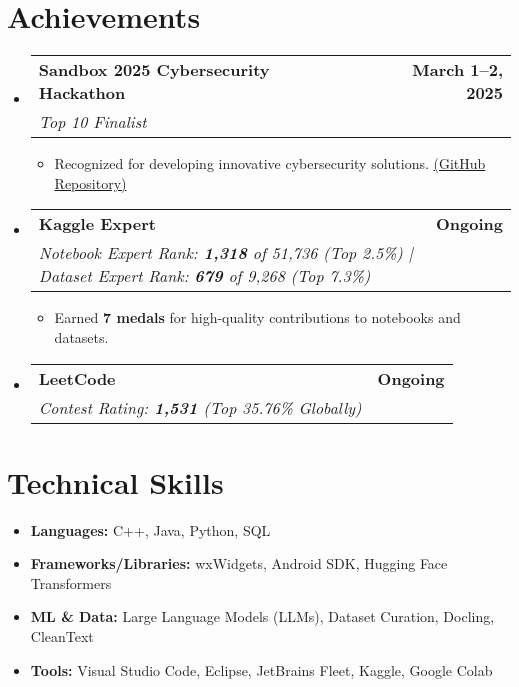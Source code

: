 \documentclass[letterpaper,10pt]{article}
\makeatletter
\newcommand{\resumeSubHeadingListStart}{\begin{itemize}[leftmargin=0.15in,label={}]}
\newcommand{\resumeSubHeadingListEnd}{\end{itemize}}
\newcommand{\resumeSubheading}[4]{%
  \item
  \begin{tabular*}{1.0\textwidth}[t]{l@{\extracolsep{\fill}}r}
    \textbf{#1} & {\small\bfseries #2} \\
    \textit{\color{primary} #3} & {\textit{\color{primary} #4}} \\
  \end{tabular*}\vspace{-2pt}
}
\newcommand{\resumeItemListStart}{\begin{itemize}[leftmargin=12pt]}
\newcommand{\resumeItemListEnd}{\end{itemize}}
\newcommand{\resumeItem}[1]{\item\small{#1}}
\makeatother
\begin{document}
\section{Achievements}
\resumeSubHeadingListStart

  \resumeSubheading
    {Sandbox 2025 Cybersecurity Hackathon}{March 1–2, 2025}
    {Top 10 Finalist}{}
    \resumeItemListStart
      \resumeItem{Recognized for developing innovative cybersecurity solutions. \href{https://github.com/EchoSingh/ML-DeepFake-Detection-Defense--BAM-}{(GitHub Repository)}}
    \resumeItemListEnd

  \resumeSubheading
    {Kaggle Expert}{Ongoing}
    {Notebook Expert Rank: \textbf{1,318} of 51,736 (Top 2.5\%) \quad | \quad Dataset Expert Rank: \textbf{679} of 9,268 (Top 7.3\%)}{}
    \resumeItemListStart
      \resumeItem{Earned \textbf{7 medals} for high-quality contributions to notebooks and datasets.}
    \resumeItemListEnd

  \resumeSubheading
    {LeetCode}{Ongoing}
    {Contest Rating: \textbf{1,531} (Top 35.76\% Globally)}{}

\resumeSubHeadingListEnd



\section*{Technical Skills}
\vspace{5pt}
\begin{itemize}[leftmargin=0.15in, label={}]
    \item \textbf{Languages:} C++, Java, Python, SQL
    \item\textbf{Frameworks/Libraries:} wxWidgets, Android SDK, Hugging Face Transformers
    \item \textbf{ML \& Data:} Large Language Models (LLMs), Dataset Curation, Docling, CleanText
    \item \textbf{Tools:} Visual Studio Code, Eclipse, JetBrains Fleet, Kaggle, Google Colab
\end{itemize}
\end{document}

